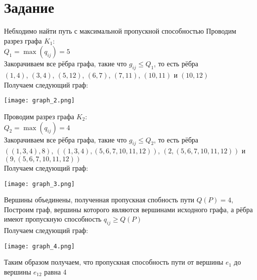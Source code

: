 \documentclass[12pt,a4paper]{report}
\begin{document}
\section*{Задание}
Небходимо найти путь с максимальной пропускной способностью
\hfill\break
Проводим разрез графа $K_1$:\\
$Q_1=\max(q_{ij})=5$\\
Закорачиваем все рёбра графа, такие что $g_{ij} \leq Q_1$, то есть рёбра\\
$(1, 4)$, $(3, 4)$, $(5, 12)$, $(6, 7)$, $(7, 11)$, $(10, 11)$ и $(10, 12)$\\
Получаем следующий граф:\\
\begin{center}
    \texttt{[image: graph\_2.png]}
\end{center}
Проводим разрез графа $K_2$:\\
$Q_2=\max(q_{ij})=4$\\
Закорачиваем все рёбра графа, такие что $g_{ij} \leq Q_2$, то есть рёбра\\
$((1, 3, 4), 8)$, $((1, 3, 4), (5, 6, 7, 10, 11, 12))$, $(2, (5, 6, 7, 10, 11, 12))$ и $(9, (5, 6, 7, 10, 11, 12))$\\
Получаем следующий граф:\\
\begin{center}
    \texttt{[image: graph\_3.png]}
\end{center}
\pagebreak
Вершины объединены, полученная пропускная спобность пути $Q(P)=4$,\\
Построим граф, вершины которого являются вершинами исходного графа, 
а рёбра имеют пропускную способность $q_{ij}\geq Q(P)$\\
Получаем следующий граф:\\
\begin{center}
    \texttt{[image: graph\_4.png]}
\end{center}
Таким образом получаем, что пропускная способность пути от вершины $e_1$ до вершины $e_{12}$ равна 4
\end{document}
